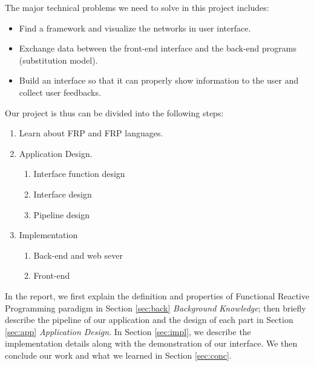The major technical problems we need to solve in this project includes:

\begin{itemize}
	\item Find a framework and visualize the networks in user interface.
	\item Exchange data between the front-end interface and the back-end programs (substitution model).
	\item Build an interface so that it can properly show information to the user and collect user feedbacks.
\end{itemize}


Our project is thus can be divided into the following steps:

\begin{enumerate}
	\item Learn about FRP and FRP languages.
	\item Application Design.
	\begin{enumerate}
		\item Interface function design
		\item Interface design
		\item Pipeline design
	\end{enumerate}
	\item Implementation
	\begin{enumerate}
		\item Back-end and web sever
		\item Front-end
	\end{enumerate}
\end{enumerate}

In the report, we first explain the definition and properties of Functional Reactive Programming paradigm in Section \ref{sec:back} \textit{Background Knowledge}; then briefly describe the pipeline of our application and the design of each part in Section \ref{sec:app} \textit{Application Design}.  In Section \ref{sec:impl}, we describe the implementation details along with the demonstration of our interface. We then conclude our work and what we learned in Section \ref{sec:conc}.